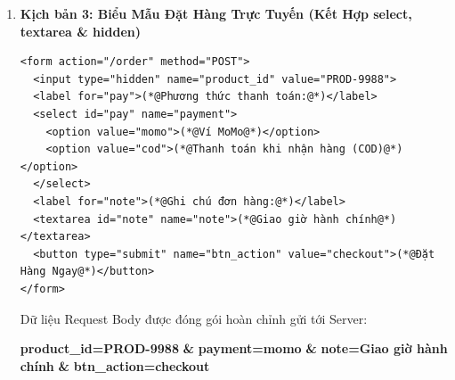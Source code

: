 \begin{enumerate}[leftmargin=1.5em, itemsep=8pt, parsep=0pt]
\begin{browserWindow}
\sffamily\small
Khi bấm \textbf{"Lọc kết quả"}, trình duyệt nối tất cả thuộc tính  và  thành URL:
\begin{tcolorbox}[colback=codeBg, colframe=primaryBlue!40, arc=4pt, boxrule=0.8pt, left=10pt, right=10pt, top=6pt, bottom=6pt]
\textcolor{primaryBlue}{\textbf{/search}}\textcolor{darkText}{\textbf{?}}\textcolor{accentOrange}{\textbf{q}}\textcolor{darkText}{\textbf{=}}\textcolor{primaryBlue}{\textbf{iPhone}}\textcolor{darkText}{\textbf{\&}}\textcolor{accentOrange}{\textbf{price\_min}}\textcolor{darkText}{\textbf{=}}\textcolor{primaryBlue}{\textbf{1000}}\textcolor{darkText}{\textbf{\&}}\textcolor{accentOrange}{\textbf{price\_max}}\textcolor{darkText}{\textbf{=}}\textcolor{primaryBlue}{\textbf{2000}}\textcolor{darkText}{\textbf{\&}}\textcolor{accentOrange}{\textbf{in\_stock}}\textcolor{darkText}{\textbf{=}}\textcolor{primaryBlue}{\textbf{1}}
\end{tcolorbox}
\end{browserWindow}

\item \textbf{Kịch bản 3: Biểu Mẫu Đặt Hàng Trực Tuyến (Kết Hợp select, textarea \& hidden)}
\begin{codeWindow}
\begin{lstlisting}[language=HTML5]
<form action="/order" method="POST">
  <input type="hidden" name="product_id" value="PROD-9988">
  <label for="pay">(*@Phương thức thanh toán:@*)</label>
  <select id="pay" name="payment">
    <option value="momo">(*@Ví MoMo@*)</option>
    <option value="cod">(*@Thanh toán khi nhận hàng (COD)@*)</option>
  </select>
  <label for="note">(*@Ghi chú đơn hàng:@*)</label>
  <textarea id="note" name="note">(*@Giao giờ hành chính@*)</textarea>
  <button type="submit" name="btn_action" value="checkout">(*@Đặt Hàng Ngay@*)</button>
</form>
\end{lstlisting}
\end{codeWindow}

\begin{browserWindow}
\sffamily\small
Dữ liệu Request Body được đóng gói hoàn chỉnh gửi tới Server:
\begin{tcolorbox}[colback=codeBg, colframe=primaryBlue!30, arc=4pt, boxrule=0.8pt, left=10pt, right=10pt, top=6pt, bottom=6pt]
\textcolor{accentOrange}{\textbf{product\_id}}\textcolor{darkText}{\textbf{=PROD-9988}} \quad \textcolor{darkText}{\textbf{\&}} \quad
\textcolor{accentOrange}{\textbf{payment}}\textcolor{darkText}{\textbf{=momo}} \quad \textcolor{darkText}{\textbf{\&}} \newline
\textcolor{accentOrange}{\textbf{note}}\textcolor{darkText}{\textbf{=Giao giờ hành chính}} \quad \textcolor{darkText}{\textbf{\&}} \quad
\textcolor{accentOrange}{\textbf{btn\_action}}\textcolor{darkText}{\textbf{=checkout}}
\end{tcolorbox}
\end{browserWindow}
\end{enumerate}

